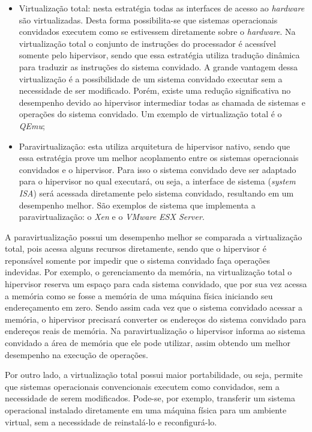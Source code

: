 \begin{itemize}
 \item Virtualização total: nesta estratégia todas as interfaces de acesso ao \textit{hardware} são virtualizadas. Desta forma
 possibilita-se que sistemas operacionais convidados executem como se estivessem diretamente sobre o \textit{hardware}. Na virtualização
 total o conjunto de instruções do processador é acessível somente pelo hipervisor, sendo que essa estratégia utiliza tradução dinâmica
 para traduzir as instruções do sistema convidado. A grande vantagem dessa virtualização é a possibilidade de um sistema convidado 
 executar sem a necessidade de ser modificado. Porém, existe uma redução significativa no desempenho devido ao hipervisor intermediar 
 todas as chamada de sistemas e operações do sistema convidado. Um exemplo de virtualização total é o \textit{QEmu};
 \item Paravirtualização: esta utiliza arquitetura de hipervisor nativo, sendo que essa estratégia prove um melhor acoplamento entre os 
 sistemas operacionais convidados e o hipervisor. Para isso o sistema convidado deve ser adaptado para o hipervisor no qual executará, 
 ou seja, a interface de sistema (\textit{system ISA}) será acessada diretamente pelo sistema convidado, resultando em um desempenho melhor. 
 São exemplos de sistema que implementa a paravirtualização: o \textit{Xen} e o \textit{VMware ESX Server}.
\end{itemize}

A paravirtualização possui um desempenho melhor se comparada a virtualização total, pois acessa alguns recursos diretamente, sendo que 
o hipervisor é reponsável somente por impedir que o sistema convidado faça operações indevidas. Por exemplo, o gerenciamento da memória, 
na virtualização total o hipervisor reserva um espaço para cada sistema convidado, que por sua vez acessa a memória como se fosse a memória 
de uma máquina física iniciando seu endereçamento em zero. Sendo assim cada vez que o sistema convidado acessar a memória, o hipervisor 
precisará converter os endereços do sistema convidado para endereços reais de memória. Na paravirtualização o hipervisor informa ao sistema 
convidado a área de memória que ele pode utilizar, assim obtendo um melhor desempenho na execução de operações.

Por outro lado, a virtualização total possui maior portabilidade, ou seja, permite que sistemas operacionais convencionais executem
como convidados, sem a necessidade de serem modificados. Pode-se, por exemplo, transferir um sistema operacional instalado diretamente 
em uma máquina física para um ambiente virtual, sem a necessidade de reinstalá-lo e reconfigurá-lo.

